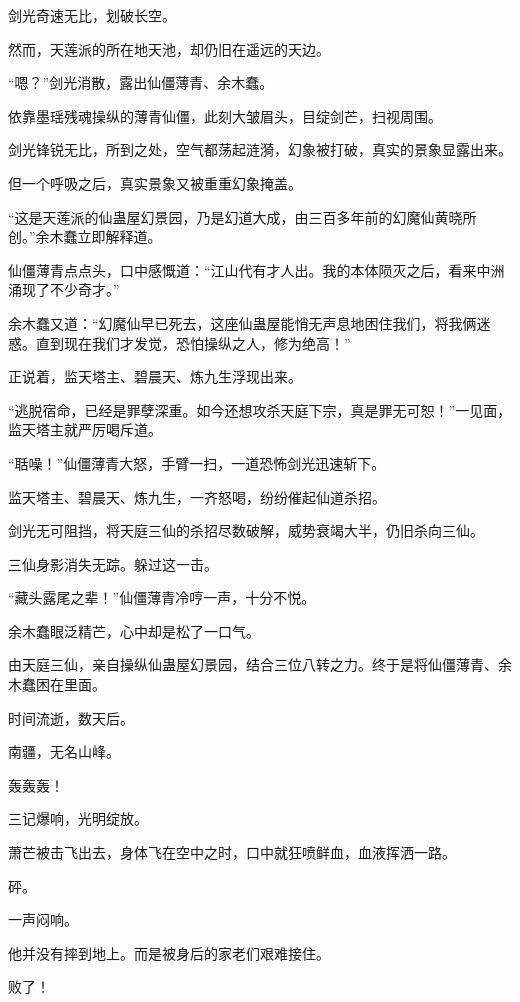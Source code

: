 
\begin{this_body}

剑光奇速无比，划破长空。

然而，天莲派的所在地天池，却仍旧在遥远的天边。

“嗯？”剑光消散，露出仙僵薄青、余木蠢。

依靠墨瑶残魂操纵的薄青仙僵，此刻大皱眉头，目绽剑芒，扫视周围。

剑光锋锐无比，所到之处，空气都荡起涟漪，幻象被打破，真实的景象显露出来。

但一个呼吸之后，真实景象又被重重幻象掩盖。

“这是天莲派的仙蛊屋幻景园，乃是幻道大成，由三百多年前的幻魔仙黄晓所创。”余木蠢立即解释道。

仙僵薄青点点头，口中感慨道：“江山代有才人出。我的本体陨灭之后，看来中洲涌现了不少奇才。”

余木蠢又道：“幻魔仙早已死去，这座仙蛊屋能悄无声息地困住我们，将我俩迷惑。直到现在我们才发觉，恐怕操纵之人，修为绝高！”

正说着，监天塔主、碧晨天、炼九生浮现出来。

“逃脱宿命，已经是罪孽深重。如今还想攻杀天庭下宗，真是罪无可恕！”一见面，监天塔主就严厉喝斥道。

“聒噪！”仙僵薄青大怒，手臂一扫，一道恐怖剑光迅速斩下。

监天塔主、碧晨天、炼九生，一齐怒喝，纷纷催起仙道杀招。

剑光无可阻挡，将天庭三仙的杀招尽数破解，威势衰竭大半，仍旧杀向三仙。

三仙身影消失无踪。躲过这一击。

“藏头露尾之辈！”仙僵薄青冷哼一声，十分不悦。

余木蠢眼泛精芒，心中却是松了一口气。

由天庭三仙，亲自操纵仙蛊屋幻景园，结合三位八转之力。终于是将仙僵薄青、余木蠢困在里面。

时间流逝，数天后。

南疆，无名山峰。

轰轰轰！

三记爆响，光明绽放。

萧芒被击飞出去，身体飞在空中之时，口中就狂喷鲜血，血液挥洒一路。

砰。

一声闷响。

他并没有摔到地上。而是被身后的家老们艰难接住。

败了！


\end{this_body}

